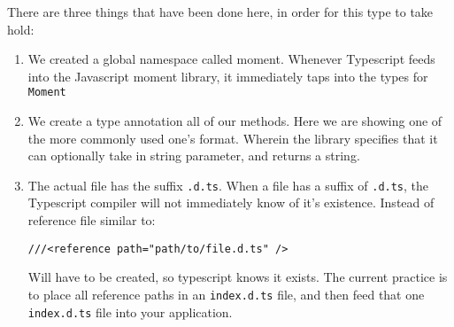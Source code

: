 There are three things that have been done here, in order for this type to take hold:
\begin{enumerate}
\item We created a global namespace called moment. Whenever Typescript feeds into the Javascript moment library, it immediately taps into the types for \lstinline{Moment}
\item We create a type annotation all of our methods. Here we are showing one of the more commonly used one's format. Wherein the library specifies that it can optionally take in string parameter, and returns a string.
\item The actual file has the suffix \lstinline{.d.ts}. When a file has a suffix of \lstinline{.d.ts}, the Typescript compiler will not immediately know of it's existence. Instead of reference file similar to: 
\begin{verbatim} 
///<reference path="path/to/file.d.ts" />
\end{verbatim} 
Will have to be created, so typescript knows it exists. The current practice is to place all reference paths in an \lstinline{index.d.ts} file, and then feed that one \lstinline{index.d.ts} file into your application.
\end{enumerate}